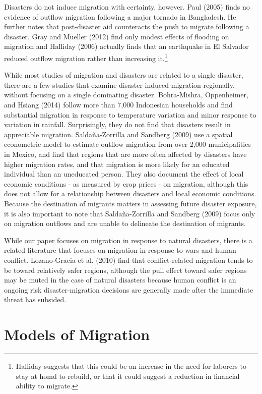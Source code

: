 \documentclass[]{article}
\let\rmarkdownfootnote\footnote%
\def\footnote{\protect\rmarkdownfootnote}
\begin{document}
Disasters do not induce migration with certainty, however. Paul (2005)
finds no evidence of outflow migration following a major tornado in
Bangladesh. He further notes that post-disaster aid counteracts the push
to migrate following a disaster. Gray and Mueller (2012) find only
modest effects of flooding on migration and Halliday (2006) actually
finds that an earthquake in El Salvador reduced outflow migration rather
than increasing it.\footnote{Halliday suggests that this could be an
  increase in the need for laborers to stay at homd to rebuild, or that
  it could suggest a reduction in financial ability to migrate.}

While most studies of migration and disasters are related to a single
disaster, there are a few studies that examine disaster-induced
migration regionally, without focusing on a single dominating disaster.
Bohra-Mishra, Oppenheimer, and Hsiang (2014) follow more than 7,000
Indonesian households and find substantial migration in response to
temperature variation and minor response to variation in rainfall.
Surprisingly, they do not find that disasters result in appreciable
migration. Saldaña-Zorrilla and Sandberg (2009) use a spatial
econometric model to estimate outflow migration from over 2,000
municipalities in Mexico, and find that regions that are more often
affected by disasters have higher migration rates, and that migration is
more likely for an educated individual than an uneducated person. They
also document the effect of local economic conditions - as measured by
crop prices - on migration, although this does not allow for a
relationship between disasters and local economic conditions. Because
the destination of migrants matters in assessing future disaster
exposure, it is also important to note that Saldaña-Zorrilla and
Sandberg (2009) focus only on migration outflows and are unable to
delineate the destination of migrants.

While our paper focuses on migration in response to natural disasters,
there is a related literature that focuses on migration in response to
wars and human conflict. Lozano-Gracia et al. (2010) find that
conflict-related migration tends to be toward relatively safer regions,
although the pull effect toward safer regions may be muted in the case
of natural disasters because human conflict is an ongoing risk
disaster-migration decisions are generally made after the immediate
threat has subsided.

\section{Models of Migration}\label{models-of-migration}
\end{document}
